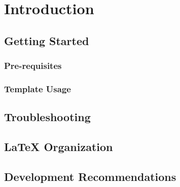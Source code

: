 \chapter{Introduction}
\label{chap:introduction}

\section{Getting Started}
\label{chap:introduction:sec:getting-started}

\subsection{Pre-requisites}
\label{chap:introduction:sec:getting-started:subsec:pre-requisites}

\subsection{Template Usage}
\label{chap:introduction:sec:getting-started:subsec:template-usage}

\section{Troubleshooting}
\label{chap:introduction:sec:troubleshooting}

\section{\LaTeX{} Organization}
\label{chap:introduction:sec:latex-organization}

\section{Development Recommendations}
\label{chap:introduction:sec:development-recommendations}
